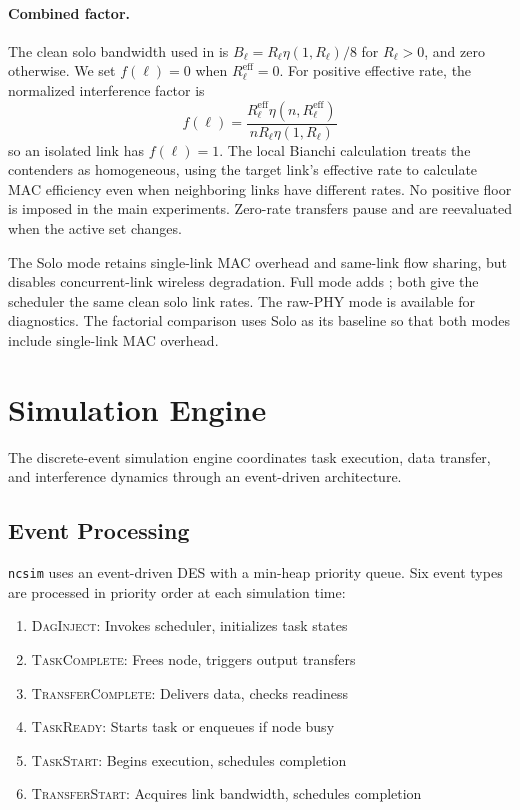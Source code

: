\documentclass[conference]{IEEEtran}
\newcommand{\ncsim}{\texttt{ncsim}}
\begin{document}
\paragraph{Combined factor.}
The clean solo bandwidth used in  is
$B_\ell=R_\ell\eta(1,R_\ell)/8$ for $R_\ell>0$, and zero otherwise.
We set $f(\ell)=0$ when $R_\ell^{\mathrm{eff}}=0$.
For positive effective rate, the normalized interference factor is
\begin{equation}
\boxed{f(\ell)=
 \frac{R_\ell^{\mathrm{eff}}\eta(n,R_\ell^{\mathrm{eff}})}
 {nR_\ell\eta(1,R_\ell)}}
\label{eq:combined}
\end{equation}
so an isolated link has $f(\ell)=1$. The local Bianchi calculation treats
the contenders as homogeneous, using the target link's effective rate
to calculate MAC efficiency even when neighboring links have different rates.
No positive floor is imposed in the main experiments. Zero-rate transfers
pause and are reevaluated when the active set changes.

The Solo mode retains single-link MAC overhead and same-link flow sharing,
but disables concurrent-link wireless degradation. Full mode adds
; both give the scheduler the same clean solo link rates.
The raw-PHY mode is available for diagnostics. The factorial comparison
uses Solo as its baseline so that both modes include single-link MAC overhead.

\section{Simulation Engine}
\label{sec:engine}

The discrete-event simulation engine coordinates
task execution, data transfer, and interference dynamics through an
event-driven architecture.

\subsection{Event Processing}

\ncsim{} uses an event-driven DES with a min-heap priority queue.  Six event
types are processed in priority order at each simulation time:

\begin{enumerate}[itemsep=1pt,leftmargin=*]
\item \textsc{DagInject}: Invokes scheduler, initializes task states
\item \textsc{TaskComplete}: Frees node, triggers output transfers
\item \textsc{TransferComplete}: Delivers data, checks readiness
\item \textsc{TaskReady}: Starts task or enqueues if node busy
\item \textsc{TaskStart}: Begins execution, schedules completion
\item \textsc{TransferStart}: Acquires link bandwidth, schedules completion
\end{enumerate}
\end{document}

